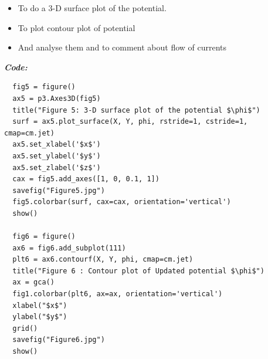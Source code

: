 \documentclass[11pt, a4paper]{article}
\begin{document}
\begin{itemize}
\item
  To do a 3-D surface plot of the potential.
\item
  To plot contour plot of potential
\item
  And analyse them and to comment about flow of currents
\end{itemize}
\textit{\textbf{Code:}}
\begin{lstlisting}
  fig5 = figure()
  ax5 = p3.Axes3D(fig5)
  title("Figure 5: 3-D surface plot of the potential $\phi$")
  surf = ax5.plot_surface(X, Y, phi, rstride=1, cstride=1, cmap=cm.jet)
  ax5.set_xlabel('$x$')
  ax5.set_ylabel('$y$')
  ax5.set_zlabel('$z$')
  cax = fig5.add_axes([1, 0, 0.1, 1])
  savefig("Figure5.jpg")
  fig5.colorbar(surf, cax=cax, orientation='vertical')
  show()

  fig6 = figure()
  ax6 = fig6.add_subplot(111)
  plt6 = ax6.contourf(X, Y, phi, cmap=cm.jet)
  title("Figure 6 : Contour plot of Updated potential $\phi$")
  ax = gca()
  fig1.colorbar(plt6, ax=ax, orientation='vertical')
  xlabel("$x$")
  ylabel("$y$")
  grid()
  savefig("Figure6.jpg")
  show()

  \end{lstlisting}
\end{document}
